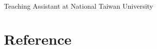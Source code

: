 \documentclass{article}
\newcommand{\cvsection}[1]{\section*{\rmfamily#1}}
\begin{document}
\hspace{2em}Teaching Assistant at National Taiwan University


















\cvsection{Reference}
\indent
\end{document}
